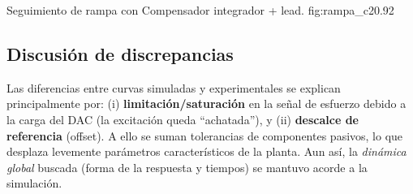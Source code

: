 {Seguimiento de rampa con Compensador integrador + lead.}
{fig:rampa_c2}{0.92}

\subsection{Discusión de discrepancias}
Las diferencias entre curvas simuladas y experimentales se explican principalmente por: (i) \textbf{limitación/saturación} en la señal de esfuerzo debido a la carga del DAC (la excitación queda “achatada”), y (ii) \textbf{descalce de referencia} (offset). A ello se suman tolerancias de componentes pasivos, lo que desplaza levemente parámetros característicos de la planta. Aun así, la \emph{dinámica global} buscada (forma de la respuesta y tiempos) se mantuvo acorde a la simulación.


